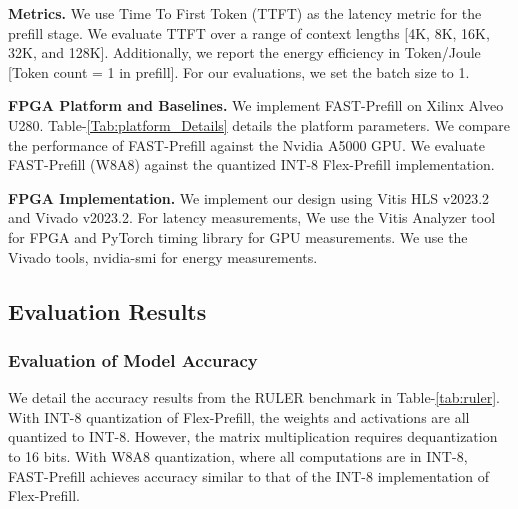 \documentclass[conference]{IEEEtran}
\begin{document}
\textbf{Metrics.} We use Time To First Token (TTFT) as the latency metric for the prefill stage. We evaluate TTFT over a range of context lengths [4K, 8K, 16K, 32K, and 128K]. Additionally, we report the energy efficiency in Token/Joule [Token count = 1 in prefill]. For our evaluations, we set the batch size to 1. 

\textbf{FPGA Platform and Baselines.} We implement FAST-Prefill on Xilinx Alveo U280. Table-\ref{Tab:platform_Details} details the platform parameters. We compare the performance of FAST-Prefill against the Nvidia A5000 GPU. We evaluate FAST-Prefill (W8A8) against the quantized INT-8 Flex-Prefill implementation. 

\textbf{FPGA Implementation.} We implement our design using Vitis HLS v2023.2 and Vivado v2023.2. For latency measurements, We use the Vitis Analyzer tool for FPGA and PyTorch timing library for GPU measurements. We use the Vivado tools, nvidia-smi for energy measurements.

\subsection{Evaluation Results}

\subsubsection{Evaluation of Model Accuracy}
We detail the accuracy results from the RULER benchmark in Table-\ref{tab:ruler}. With INT-8 quantization of Flex-Prefill, the weights and activations are all quantized to INT-8. However, the matrix multiplication requires dequantization to 16 bits. With W8A8 quantization, where all computations are in INT-8, FAST-Prefill achieves accuracy similar to that of the INT-8 implementation of Flex-Prefill. 
\end{document}
